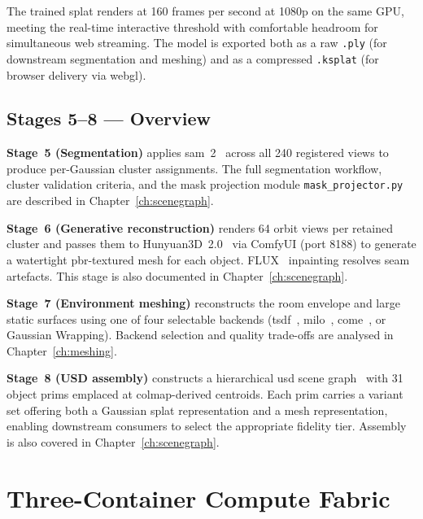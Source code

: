 The trained splat renders at 160 frames per second at 1080p on the same GPU, meeting the
real-time interactive threshold with comfortable headroom for simultaneous web streaming.
The model is exported both as a raw \texttt{.ply} (for downstream segmentation and meshing)
and as a compressed \texttt{.ksplat} (for browser delivery via \acrshort{webgl}).

\subsection{Stages 5–8 — Overview}

\textbf{Stage~5 (Segmentation)} applies \acrshort{sam}~2~\citep{Ravi2024SAM2} across all
240 registered views to produce per-Gaussian cluster assignments. The full segmentation
workflow, cluster validation criteria, and the mask projection module
\texttt{mask\_projector.py} are described in Chapter~\ref{ch:scenegraph}.

\textbf{Stage~6 (Generative reconstruction)} renders 64 orbit views per retained cluster
and passes them to Hunyuan3D~2.0~\citep{Zhao2025Hunyuan} via ComfyUI (port 8188) to
generate a watertight \acrshort{pbr}-textured mesh for each object. FLUX~\citep{FLUX2024}
inpainting resolves seam artefacts. This stage is also documented in
Chapter~\ref{ch:scenegraph}.

\textbf{Stage~7 (Environment meshing)} reconstructs the room envelope and large static
surfaces using one of four selectable backends (\acrshort{tsdf}~\citep{Curless1996},
\acrshort{milo}~\citep{Guedon2025MILo}, \acrshort{come}~\citep{Radl2025CoMe}, or
Gaussian Wrapping). Backend selection and quality trade-offs are analysed in
Chapter~\ref{ch:meshing}.

\textbf{Stage~8 (USD assembly)} constructs a hierarchical \acrshort{usd} scene
graph~\citep{Pixar2019} with 31 object prims emplaced at \acrshort{colmap}-derived
centroids. Each prim carries a variant set offering both a Gaussian splat representation
and a mesh representation, enabling downstream consumers to select the appropriate fidelity
tier. Assembly is also covered in Chapter~\ref{ch:scenegraph}.

\section{Three-Container Compute Fabric}\label{sec:containers}

